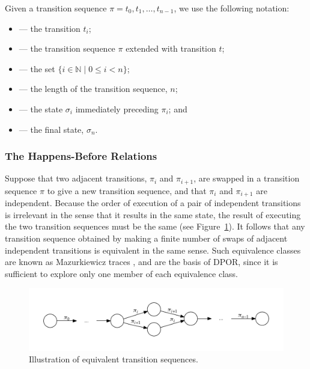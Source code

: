 \documentclass[12pt,a4paper,twoside,openany]{report}
\begin{document}
Given a transition sequence $\pi = t_0, t_1, \ldots, t_{n-1}$,
we use the following notation:
\begin{itemize}[label={}]
	\newcommand{\defsindent}{3.5em}
	\item{\makebox[\defsindent]{\hfill$\pi_i$}
		--- the transition $t_i$;}
	\item{\makebox[\defsindent]{\hfill$\pi.t$}
		--- the transition sequence $\pi$ extended with
		transition $t$;}
	\item{\makebox[\defsindent]{\hfill$\textit{dom}(\pi)$}
		--- the set $\{i \in \mathbb{N} \mid 0 \leq i < n \}$;}
	\item{\makebox[\defsindent]{\hfill$|\pi|$}
		--- the length of the transition sequence, $n$;}
	\item{\makebox[\defsindent]{\hfill$\textit{pre}(\pi, i)$}
		--- the state $\sigma_i$ immediately preceding $\pi_i$; and}
	\item{\makebox[\defsindent]{\hfill$\textit{last}(\pi)$}
		--- the final state, $\sigma_n$.}
\end{itemize}

\subsubsection{The Happens-Before Relations}\label{sec:happens-before}

Suppose that two adjacent transitions, $\pi_i$ and $\pi_{i+1}$,
are swapped in a
transition sequence $\pi$ to give a new
transition sequence, and that
$\pi_i$ and $\pi_{i+1}$ are independent.
Because the order of execution of a
pair of independent transitions is
irrelevant in the sense that it
results in the same state, the result
of executing the two transition
sequences must be the same
(see Figure~\ref{fig:sequence-equivalence}).
It follows that any transition sequence obtained
by making a finite number of swaps of adjacent
independent transitions is equivalent in the same
sense. Such equivalence classes are known as
Mazurkiewicz traces \cite{maz87}, and are
the basis of DPOR, since it is
sufficient to explore only one member of
each equivalence class.

\begin{figure}[b]
	\centering
	\includegraphics[width=\textwidth]{seqequiv}
	\caption{Illustration of equivalent transition sequences.}
	\label{fig:sequence-equivalence}
\end{figure}
\end{document}
